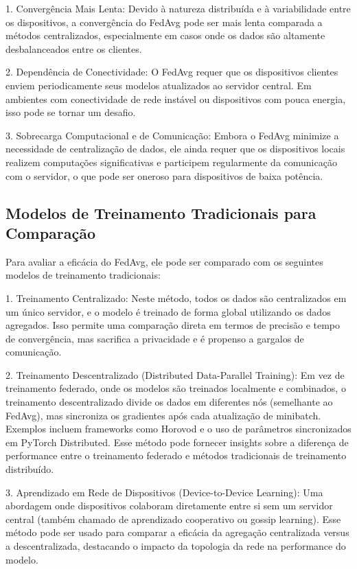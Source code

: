 1. Convergência Mais Lenta: Devido à natureza distribuída e à variabilidade entre os dispositivos, a convergência do FedAvg pode ser mais lenta comparada a métodos centralizados, especialmente em casos onde os dados são altamente desbalanceados entre os clientes.

2. Dependência de Conectividade: O FedAvg requer que os dispositivos clientes enviem periodicamente seus modelos atualizados ao servidor central. Em ambientes com conectividade de rede instável ou dispositivos com pouca energia, isso pode se tornar um desafio.

3. Sobrecarga Computacional e de Comunicação: Embora o FedAvg minimize a necessidade de centralização de dados, ele ainda requer que os dispositivos locais realizem computações significativas e participem regularmente da comunicação com o servidor, o que pode ser oneroso para dispositivos de baixa potência.

\subsection{Modelos de Treinamento Tradicionais para Comparação}

Para avaliar a eficácia do FedAvg, ele pode ser comparado com os seguintes modelos de treinamento tradicionais:

1. Treinamento Centralizado: Neste método, todos os dados são centralizados em um único servidor, e o modelo é treinado de forma global utilizando os dados agregados. Isso permite uma comparação direta em termos de precisão e tempo de convergência, mas sacrifica a privacidade e é propenso a gargalos de comunicação.

2. Treinamento Descentralizado (Distributed Data-Parallel Training): Em vez de treinamento federado, onde os modelos são treinados localmente e combinados, o treinamento descentralizado divide os dados em diferentes nós (semelhante ao FedAvg), mas sincroniza os gradientes após cada atualização de minibatch. Exemplos incluem frameworks como Horovod e o uso de parâmetros sincronizados em PyTorch Distributed. Esse método pode fornecer insights sobre a diferença de performance entre o treinamento federado e métodos tradicionais de treinamento distribuído.

3. Aprendizado em Rede de Dispositivos (Device-to-Device Learning): Uma abordagem onde dispositivos colaboram diretamente entre si sem um servidor central (também chamado de aprendizado cooperativo ou gossip learning). Esse método pode ser usado para comparar a eficácia da agregação centralizada versus a descentralizada, destacando o impacto da topologia da rede na performance do modelo.

